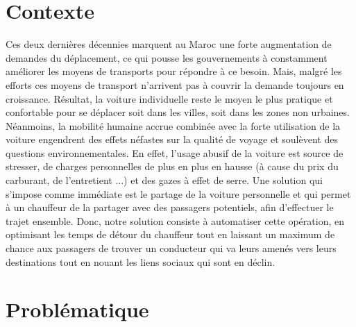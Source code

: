 
\section{Contexte}

Ces deux dernières décennies marquent au Maroc une forte augmentation de demandes du déplacement, ce qui pousse les gouvernements à constamment améliorer les moyens de transports pour répondre à ce besoin.\newline
Mais, malgré les efforts ces moyens de transport n'arrivent pas à couvrir la demande toujours en croissance.\newline
Résultat, la voiture individuelle reste le moyen le plus pratique et confortable pour se déplacer soit dans les villes, soit dans les zones non urbaines. Néanmoins, la mobilité humaine accrue combinée avec la forte utilisation de la voiture engendrent des effets néfastes sur la qualité de voyage et soulèvent des questions environnementales.\newline
En effet, l'usage abusif de la voiture est source de stresser, de charges personnelles de plus en plus en hausse (à cause du prix du carburant, de l'entretient ...) et des gazes à effet de serre.\newline
Une solution qui s'impose comme immédiate est le partage de la voiture personnelle et qui permet à un chauffeur de la partager avec des passagers potentiels, afin d'effectuer le trajet ensemble.\newline
Donc, notre solution consiste à automatiser cette opération, en optimisant les temps de détour du chauffeur tout en laissant un maximum de chance aux passagers de trouver un conducteur qui va leurs amenés vers leurs destinations tout en nouant les liens sociaux qui sont en déclin.

\section{Problématique}

